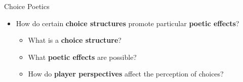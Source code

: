\documentclass[xcolor=x11names]{beamer}
\begin{document}
\begin{frame}{Choice Poetics}
  \vfill
  \begin{itemize}\addtolength{\itemsep}{0.5\baselineskip}
      \item How do certain \textbf{choice structures} promote particular \textbf{poetic effects}?
    \begin{itemize}\addtolength{\itemsep}{0.5\baselineskip}
      \vspace{0.5\baselineskip}
      \item What is a \textbf{choice structure}?
      \item What \textbf{poetic effects} are possible?
      \item How do \textbf{player perspectives} affect the perception of choices?
    \end{itemize}
  \end{itemize}
  \vfill
  \centering
  \tiny
\end{frame}
\end{document}
